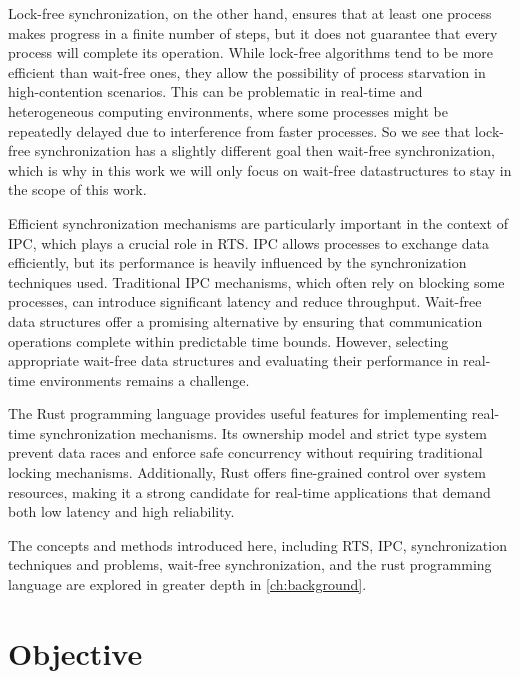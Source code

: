 Lock-free synchronization, on the other hand, ensures that at least one process makes progress in a finite number of steps, but it does not guarantee that every process will complete its operation. While lock-free algorithms tend to be more efficient than wait-free ones, they allow the possibility of process starvation in high-contention scenarios. This can be problematic in real-time and heterogeneous computing environments, where some processes might be repeatedly delayed due to interference from faster processes. So we see that lock-free synchronization has a slightly different goal then wait-free synchronization, which is why in this work we will only focus on wait-free datastructures to stay in the scope of this work. \cite{kogan2012methodology}

Efficient synchronization mechanisms are particularly important in the context of \ac{IPC}, which plays a crucial role in \ac{RTS}. \ac{IPC} allows processes to exchange data efficiently, but its performance is heavily influenced by the synchronization techniques used. Traditional \ac{IPC} mechanisms, which often rely on blocking some processes, can introduce significant latency and reduce throughput. Wait-free data structures offer a promising alternative by ensuring that communication operations complete within predictable time bounds. However, selecting appropriate wait-free data structures and evaluating their performance in real-time environments remains a challenge. \cite{timnat2014practical, michael1996simple, huang2002improvingWaitFree, pellegrini2020relevancewaitfreecoordinationalgorithms}

The Rust programming language provides useful features for implementing real-time synchronization mechanisms. Its ownership model and strict type system prevent data races and enforce safe concurrency without requiring traditional locking mechanisms. Additionally, Rust offers fine-grained control over system resources, making it a strong candidate for real-time applications that demand both low latency and high reliability. \cite{xu2023rust, sharma2024rustembeddedsystemscurrent}

The concepts and methods introduced here, including \ac{RTS}, \ac{IPC}, synchronization techniques and problems, wait-free synchronization, and the rust programming language are explored in greater depth in \cref{ch:background}. 

\section{Objective}\label{sec:objective}


